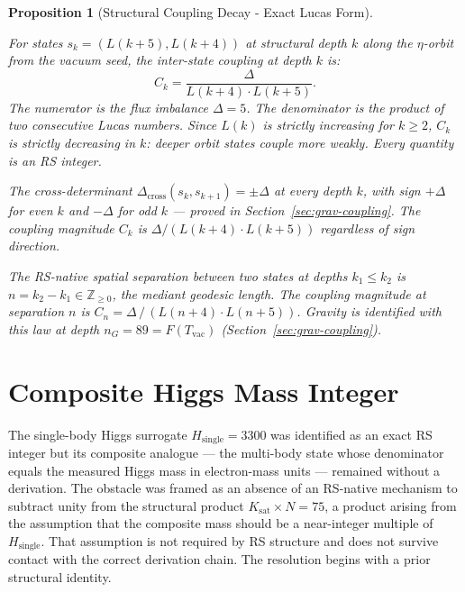 \documentclass[11pt, letterpaper]{article}
\newcommand{\Dcross}{\Delta_{\mathrm{cross}}}
\theoremstyle{definition}
\theoremstyle{plain}
\newtheorem{proposition}{Proposition}[section]
\begin{document}
\begin{proposition}[Structural Coupling Decay - Exact Lucas Form]\label{prop:coupling}
\begin{rsbox}
For states $s_k = (L(k+5), L(k+4))$ at structural depth $k$ along the
$\eta$-orbit from the vacuum seed, the inter-state coupling at depth $k$ is:
\[
C_k = \frac{\Delta}{L(k+4)\cdot L(k+5)}.
\]
The numerator is the flux imbalance $\Delta = 5$.  The denominator is the
product of two consecutive Lucas numbers.  Since $L(k)$ is strictly
increasing for $k\geq 2$, $C_k$ is strictly decreasing in $k$: deeper
orbit states couple more weakly.  Every quantity is an RS integer.

The cross-determinant $\Dcross(s_k, s_{k+1}) = \pm\Delta$ at every depth
$k$, with sign $+\Delta$ for even $k$ and $-\Delta$ for odd $k$ — proved in
Section~\ref{sec:grav-coupling}.  The coupling magnitude $C_k$ is
$\Delta/(L(k+4)\cdot L(k+5))$ regardless of sign direction.

The RS-native spatial separation between two states at depths $k_1 \leq k_2$
is $n = k_2 - k_1 \in \mathbb{Z}_{\geq 0}$, the mediant geodesic length.
The coupling magnitude at separation $n$ is
$C_n = \Delta\,/\,(L(n+4)\cdot L(n+5))$.
Gravity is identified with this law at depth $n_G = 89 = F(T_\mathrm{vac})$
(Section~\ref{sec:grav-coupling}).
\end{rsbox}
\end{proposition}

\newpage

\section{Composite Higgs Mass Integer}

The single-body Higgs surrogate $H_\mathrm{single} = 3300$ was identified as an exact RS
integer but its composite analogue — the multi-body state whose denominator equals the
measured Higgs mass in electron-mass units — remained without a derivation.
The obstacle was framed as an absence of an RS-native mechanism to subtract unity from
the structural product $K_\mathrm{sat} \times N = 75$, a product arising from the
assumption that the composite mass should be a near-integer multiple of $H_\mathrm{single}$.
That assumption is not required by RS structure and does not survive contact with the
correct derivation chain. The resolution begins with a prior structural identity.
\end{document}
